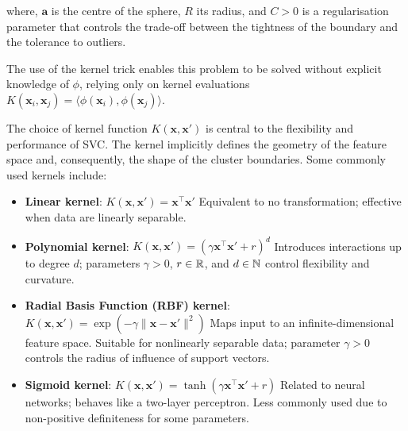 \noindent where, $\mathbf{a}$ is the centre of the sphere, $R$ its radius, and
$C > 0$ is a regularisation parameter that controls the trade-off between the
tightness of the boundary and the tolerance to outliers.

The use of the kernel trick enables this problem to be solved without explicit
knowledge of $\phi$, relying only on kernel evaluations $K(\mathbf{x}_i,
\mathbf{x}_j) = \langle \phi(\mathbf{x}_i), \phi(\mathbf{x}_j) \rangle$.

The choice of kernel function $K(\mathbf{x}, \mathbf{x}')$ is central to the
flexibility and performance of \gls{SVC}. The kernel implicitly
defines the geometry of the feature space and, consequently, the shape of the
cluster boundaries. Some commonly used kernels include:

\newpage
\begin{itemize}
  \item \textbf{Linear kernel}:
    $K(\mathbf{x}, \mathbf{x}') = \mathbf{x}^\top \mathbf{x}'$
    Equivalent to no transformation; effective when data are linearly separable.

  \item \textbf{Polynomial kernel}:
    $K(\mathbf{x}, \mathbf{x}') = (\gamma \mathbf{x}^\top \mathbf{x}' + r)^d$
    Introduces interactions up to degree $d$; parameters $\gamma > 0$,
    $r \in \rreal$, and $d \in \nnatural$ control flexibility and curvature.

  \item \textbf{Radial Basis Function (RBF) kernel}:
    $K(\mathbf{x}, \mathbf{x}') = \exp(-\gamma \|\mathbf{x} - \mathbf{x}'\|^2)$
    Maps input to an infinite-dimensional feature space. Suitable for
    nonlinearly separable data; parameter $\gamma > 0$ controls the
    radius of influence of support vectors.

  \item \textbf{Sigmoid kernel}:
    $K(\mathbf{x}, \mathbf{x}') = \tanh(\gamma \mathbf{x}^\top \mathbf{x}' + r)$
    Related to neural networks; behaves like a two-layer perceptron.
    Less commonly used due to non-positive definiteness for some parameters.

\end{itemize}

